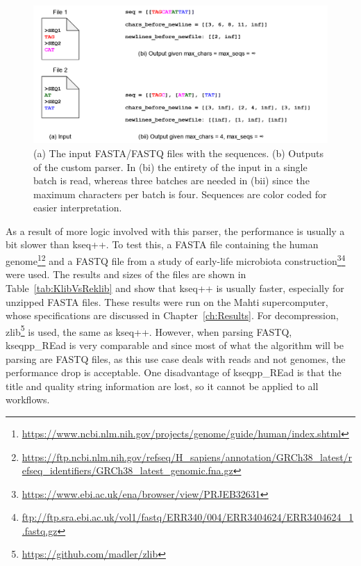 \begin{figure}[t]
  \centering
  \includegraphics[width=\textwidth]{images/FastaqParser.png}
  \caption{(a) The input FASTA/FASTQ files with the sequences. (b) Outputs of the custom parser. In (bi) the entirety of the input in a single batch is read, whereas three batches are needed in (bii) since the maximum characters per batch is four. Sequences are color coded for easier interpretation.}\label{fig:FastaqParser}
\end{figure}

As a result of more logic involved with this parser, the performance is usually a bit slower than kseq++.
To test this, a FASTA file containing the human genome\footnote{\url{https://www.ncbi.nlm.nih.gov/projects/genome/guide/human/index.shtml}}\footnote{\url{https://ftp.ncbi.nlm.nih.gov/refseq/H_sapiens/annotation/GRCh38_latest/refseq_identifiers/GRCh38_latest_genomic.fna.gz}} and a FASTQ file from a study of early-life microbiota construction\footnote{\url{https://www.ebi.ac.uk/ena/browser/view/PRJEB32631}}\footnote{\url{ftp://ftp.sra.ebi.ac.uk/vol1/fastq/ERR340/004/ERR3404624/ERR3404624_1.fastq.gz}}~\cite{ecoli_genomes_3} were used.
The results and sizes of the files are shown in Table~\ref{tab:KlibVsReklib} and show that kseq++ is usually faster, especially for unzipped FASTA files.
These results were run on the Mahti supercomputer, whose specifications are discussed in Chapter~\ref{ch:Results}.
For decompression, zlib\footnote{\url{https://github.com/madler/zlib}} is used, the same as kseq++.
However, when parsing FASTQ, kseqpp\_REad is very comparable and since most of what the algorithm will be parsing are FASTQ files, as this use case deals with reads and not genomes, the performance drop is acceptable.
One disadvantage of kseqpp\_REad is that the title and quality string information are lost, so it cannot be applied to all workflows.

